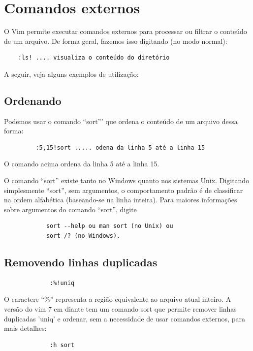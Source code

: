 \documentclass[10pt,a4paper,openany]{book}
\begin{document}
\chapter{Comandos externos}
O Vim permite executar comandos externos para processar ou filtrar o
conteúdo de um arquivo. De forma geral, fazemos isso digitando (no
modo normal):

\begin{verbatim}
   	:ls! .... visualiza o conteúdo do diretório
\end{verbatim}

A seguir, veja alguns exemplos de utilização:

\section{Ordenando}
Podemos usar o comando ``sort''' que ordena o conteúdo de um arquivo dessa forma:

\begin{verbatim}
		 :5,15!sort ..... odena da linha 5 até a linha 15
\end{verbatim}

O comando acima ordena da linha 5 até a linha 15.

O comando ``sort'' existe tanto no Windows quanto nos sistemas Unix.
Digitando simplesmente ``sort'', sem argumentos, o comportamento padrão
é de classificar na ordem alfabética (baseando-se na linha inteira).
Para maiores informações sobre argumentos do comando ``sort'', digite

\begin{verbatim}
			sort --help ou man sort (no Unix) ou
			sort /? (no Windows).
\end{verbatim}

\section{Removendo linhas duplicadas}

\begin{verbatim}
			 :%!uniq
\end{verbatim}

O caractere ``\%'' representa a região equivalente ao
arquivo atual inteiro.  A versão do vim 7 em diante tem um comando sort que permite
remover linhas duplicadas 'uniq' e ordenar, sem a necessidade
de usar comandos externos, para mais detalhes:

\begin{verbatim}
			 :h sort
\end{verbatim}
\end{document}
